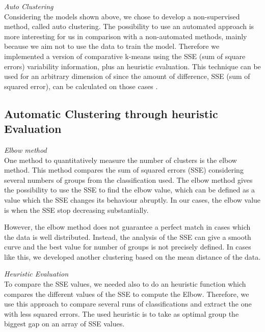     
\textit{Auto Clustering}\\
Considering the models shown above, we chose to develop a non-supervised method, called auto clustering. The possibility to use an automated approach is more interesting for us in comparison with a non-automated methods, mainly because we aim not to use the data to train the model. Therefore we implemented a version of comparative k-means using the SSE (sum of square errors) variability information, plus an heuristic evaluation. This technique can be used for an arbitrary dimension of since the amount of difference, SSE (sum of squared error), can be calculated on those cases \cite{multi_dimentionals_sse}.
    
\subsection{Automatic Clustering through heuristic Evaluation}

    \textit{Elbow method}\\
    One method to quantitatively measure the number of clusters is the elbow method. This method compares the sum of squared errors (SSE) considering several numbers of groups from the classification used. 
    The elbow method gives the possibility to use the SSE to find the elbow value, which can be defined as a value which the SSE changes its behaviour abruptly. In our cases, the elbow value is when the SSE stop decreasing substantially.
    
    However, the elbow method does not guarantee a perfect match in cases which the data is well distributed. Instead, the analysis of the SSE can give a smooth curve and the best value for number of groups is not precisely defined. In cases like this, we developed another clustering based on the mean distance of the data.
    
    \textit{Heuristic Evaluation}\\
    To compare the SSE values, we needed also to do an heuristic function which compares the different values of the SSE to compute the Elbow. 
    Therefore, we use this approach to compare several runs of classifications and extract the one with less squared errors. The used heuristic is to take as optimal group the biggest gap on an array of SSE values. 
    
